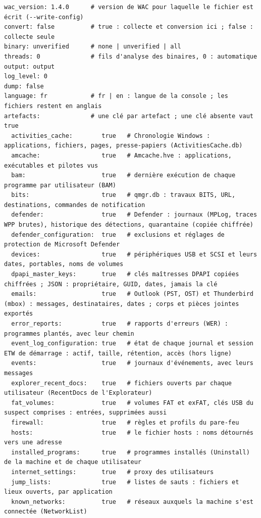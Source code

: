 \documentclass[11pt,a4paper,oneside]{report}
\begin{document}
\begin{lstlisting}
wac_version: 1.4.0      # version de WAC pour laquelle le fichier est écrit (--write-config)
convert: false          # true : collecte et conversion ici ; false : collecte seule
binary: unverified      # none | unverified | all
threads: 0              # fils d'analyse des binaires, 0 : automatique
output: output
log_level: 0
dump: false
language: fr            # fr | en : langue de la console ; les fichiers restent en anglais
artefacts:              # une clé par artefact ; une clé absente vaut true
  activities_cache:        true   # Chronologie Windows : applications, fichiers, pages, presse-papiers (ActivitiesCache.db)
  amcache:                 true   # Amcache.hve : applications, exécutables et pilotes vus
  bam:                     true   # dernière exécution de chaque programme par utilisateur (BAM)
  bits:                    true   # qmgr.db : travaux BITS, URL, destinations, commandes de notification
  defender:                true   # Defender : journaux (MPLog, traces WPP brutes), historique des détections, quarantaine (copiée chiffrée)
  defender_configuration:  true   # exclusions et réglages de protection de Microsoft Defender
  devices:                 true   # périphériques USB et SCSI et leurs dates, portables, noms de volumes
  dpapi_master_keys:       true   # clés maîtresses DPAPI copiées chiffrées ; JSON : propriétaire, GUID, dates, jamais la clé
  emails:                  true   # Outlook (PST, OST) et Thunderbird (mbox) : messages, destinataires, dates ; corps et pièces jointes exportés
  error_reports:           true   # rapports d'erreurs (WER) : programmes plantés, avec leur chemin
  event_log_configuration: true   # état de chaque journal et session ETW de démarrage : actif, taille, rétention, accès (hors ligne)
  events:                  true   # journaux d'événements, avec leurs messages
  explorer_recent_docs:    true   # fichiers ouverts par chaque utilisateur (RecentDocs de l'Explorateur)
  fat_volumes:             true   # volumes FAT et exFAT, clés USB du suspect comprises : entrées, supprimées aussi
  firewall:                true   # règles et profils du pare-feu
  hosts:                   true   # le fichier hosts : noms détournés vers une adresse
  installed_programs:      true   # programmes installés (Uninstall) de la machine et de chaque utilisateur
  internet_settings:       true   # proxy des utilisateurs
  jump_lists:              true   # listes de sauts : fichiers et lieux ouverts, par application
  known_networks:          true   # réseaux auxquels la machine s'est connectée (NetworkList)

\end{lstlisting}
\end{document}
